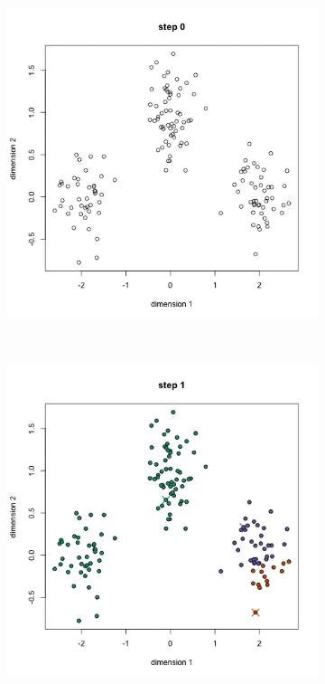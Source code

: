 \documentclass[a4paper, 14pt]{extarticle}
\begin{document}
\begin{figure}[h]
	\centering
	\begin{subfigure}[b]{0.3\textwidth}
		\includegraphics[width=\textwidth]{k_0}
		\caption{}
	\end{subfigure}
	~
	\begin{subfigure}[b]{0.3\textwidth}
		\includegraphics[width=\textwidth]{k_1}

\end{subfigure}
\end{figure}
\end{document}
